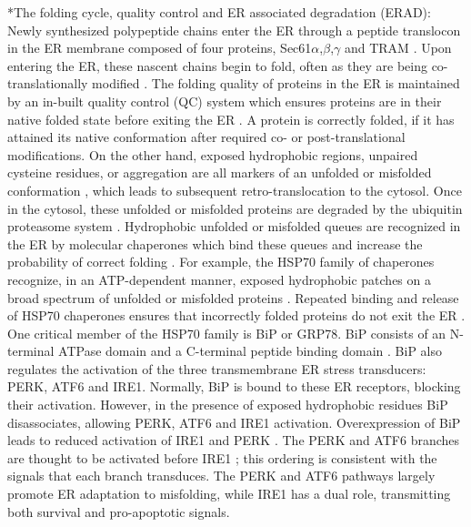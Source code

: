 \documentclass[12pt]{article}
\makeatletter
\renewcommand\subsection{\@startsection
	{subsection}{2}{0mm}
	{-0.05in}
	{-0.5\baselineskip}
	{\normalfont\normalsize\bfseries}}
\makeatother
\begin{document}
\subsection*{The folding cycle, quality control and ER associated degradation (ERAD):} 
Newly synthesized polypeptide chains enter the ER through a peptide translocon in the ER membrane composed of four proteins, Sec61$\alpha$,$\beta$,$\gamma$ and TRAM \citep{Matlack:1998kx}. 
Upon entering the ER, these nascent chains begin to fold, often as they are being co-translationally modified \citep{Fedorov:1997ys}. The folding quality of proteins in the ER is maintained by an in-built quality control (QC) system which ensures proteins are in their native folded state before exiting the ER \citep{ellgaard1999ssq,ellgaard2003qce}. A protein is correctly folded, if it has attained its native conformation after required co- or post-translational modifications. On the other hand, exposed hydrophobic regions, unpaired cysteine residues, or aggregation are all markers of an unfolded or misfolded conformation \citep{ellgaard1999ssq}, which leads to subsequent retro-translocation to the cytosol. Once in the cytosol, these unfolded or misfolded proteins are degraded by the ubiquitin proteasome system \citep{Hershko:2000kl}. Hydrophobic unfolded or misfolded queues are recognized in the ER by molecular chaperones which bind these queues and increase the probability of correct folding \citep{fra1993qce,helenius1997cca,hellman1999vab}. For example, the HSP70 family of chaperones recognize, in an ATP-dependent manner, exposed hydrophobic patches on a broad spectrum of unfolded or misfolded proteins \citep{kaufman2002unfolded}. Repeated binding and release of HSP70 chaperones ensures that incorrectly folded proteins do not exit the ER \citep{kaufman2002unfolded}. One critical member of the HSP70 family is BiP or GRP78. BiP consists of an N-terminal ATPase domain and a C-terminal peptide binding domain \citep{GETHING1999}. BiP also regulates the activation of the three transmembrane ER stress transducers: PERK, ATF6 and IRE1. Normally, BiP is bound to these ER receptors, blocking their activation. However, in the presence of exposed hydrophobic residues BiP disassociates, allowing PERK, ATF6 and IRE1 activation. Overexpression of BiP leads to reduced activation of IRE1 and PERK \citep{bertolotti2000dib,kohno1993pry}. The PERK and ATF6 branches are thought to be activated before IRE1 \citep{szegezdi2006mediators}; this ordering is consistent with the signals that each branch transduces. The PERK and ATF6 pathways largely promote ER adaptation to misfolding, while IRE1 has a dual role, transmitting both survival and pro-apoptotic signals.
\end{document}

